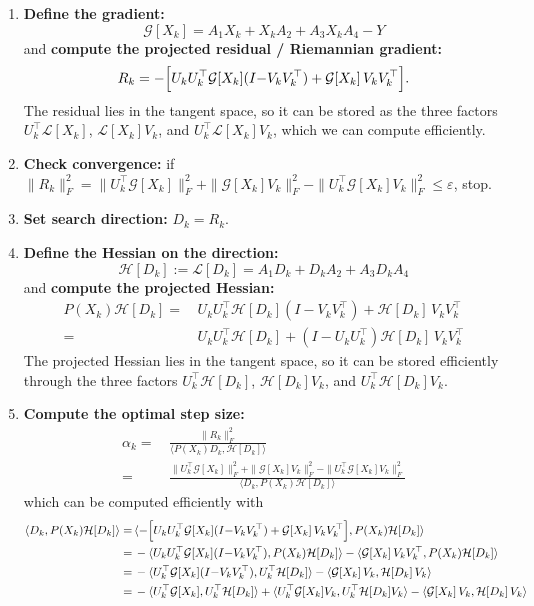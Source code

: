 \documentclass[12pt,a4paper]{article}
\newcommand{\cL}{\mathcal{L}}
\newcommand{\cG}{\mathcal{G}}
\newcommand{\cH}{\mathcal{H}}
\begin{document}
\begin{enumerate}
    \item \textbf{Define the gradient:}
    \[
        \cG[X_k] = A_1X_k + X_kA_2
                   + A_3 X_k A_4 - Y
    \]
    and \textbf{compute the projected residual / Riemannian gradient:}
    \[
        R_k = -\Bigl[U_k U_k^\top \cG[X_k](I{-}V_k V_k^\top)
              + \cG[X_k]\,V_k V_k^\top\Bigr].
    \]
    The residual lies in the tangent space, so it can be stored as the three factors $ U_k^\top\mathcal{L}[X_k]$, $\mathcal{L}[X_k]V_k $, and $U_k^\top\mathcal{L}[X_k]V_k$, which we can compute efficiently.

    \item \textbf{Check convergence:} if $\|R_k\|_F^2 = \| U_k^\top\mathcal{G}[X_k]\|_F^2 + \| \mathcal{G}[X_k]V_k\|_F^2 - \| U_k^\top\mathcal{G}[X_k]V_k \|_F^2 \le \varepsilon$, stop.

    \item \textbf{Set search direction:} $D_k = R_k$.

    \item \textbf{Define the Hessian on the direction:}
    \[
        \cH[D_k] := \cL[D_k] = A_1D_k + D_kA_2
                   + A_3 D_k A_4
    \]
    and \textbf{compute the projected Hessian:}
    \begin{align*}
        P(X_k)\cH[D_k] =\,& U_k U_k^\top \cH[D_k](I{-}V_k V_k^\top)
                   + \cH[D_k]\,V_k V_k^\top\\
                   =\,& U_k U_k^\top \cH[D_k]
                   + (I{-}U_k U_k^\top)\cH[D_k]\,V_k V_k^\top
    \end{align*}
    The projected Hessian lies in the tangent space, so it can be stored efficiently through the three factors $U_k^\top\cH[D_k]$, $\cH[D_k]V_k$, and $U_k^\top\cH[D_k]V_k $.

    \item \textbf{Compute the optimal step size:}
    \begin{align*}
        \alpha_k =\,& \frac{\|R_k\|_F^2}{\langle P(X_k)D_k,\cH[D_k]\rangle}\\
        =\,& \frac{\| U_k^\top\mathcal{G}[X_k]\|_F^2 + \| \mathcal{G}[X_k]V_k\|_F^2 - \| U_k^\top\mathcal{G}[X_k]V_k \|_F^2}{\langle D_k,P(X_k)\cH[D_k]\rangle}
    \end{align*}
    which can be computed efficiently with
    \begin{align*}
        \langle D_k,P(X_k)\cH[D_k]\rangle =\,& \langle -\Bigl[U_k U_k^\top \cG[X_k](I{-}V_k V_k^\top)
              + \cG[X_k]\,V_k V_k^\top\Bigr],P(X_k)\cH[D_k]\rangle \\
              =\,& -\langle U_k U_k^\top \cG[X_k](I{-}V_k V_k^\top),P(X_k)\cH[D_k]\rangle - \langle \cG[X_k]\,V_k V_k^\top,P(X_k)\cH[D_k]\rangle \\
              =\,& -\langle U_k^\top \cG[X_k](I{-}V_k V_k^\top),U_k^\top \cH[D_k]\rangle - \langle \cG[X_k]\,V_k ,\cH[D_k]\,V_k \rangle \\
              =\,& -\langle U_k^\top \cG[X_k],U_k^\top \cH[D_k]\rangle + \langle U_k^\top \cG[X_k]V_k,U_k^\top \cH[D_k]V_k\rangle- \langle \cG[X_k]\,V_k ,\cH[D_k]\,V_k \rangle
    \end{align*}


\end{enumerate}
\end{document}
